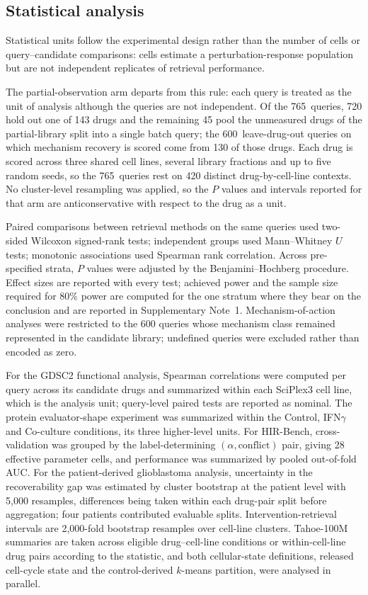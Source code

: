 \documentclass[11pt,letterpaper]{article}
\newcommand{\NALL}{765}                 %
\newcommand{\NMOA}{600}                 %
\begin{document}
\subsection*{Statistical analysis}

Statistical units follow the experimental design rather than the number of cells or
query--candidate comparisons: cells estimate a perturbation-response population but are not
independent replicates of retrieval performance\cite{PseudoRep}.

The partial-observation arm departs from this rule: each query is treated as the unit of analysis although the
queries are not independent. Of the \NALL\ queries, 720 hold out one of 143 drugs and the remaining 45 pool the
unmeasured drugs of the partial-library split into a single batch query; the \NMOA\ leave-drug-out queries on
which mechanism recovery is scored come from 130 of those drugs. Each drug is scored across three shared cell
lines, several library fractions and up to five random seeds, so the \NALL\ queries rest on 420 distinct
drug-by-cell-line contexts. No cluster-level resampling was applied, so the $P$ values and intervals reported for
that arm are anticonservative with respect to the drug as a unit.

Paired comparisons between retrieval methods on the same queries used two-sided Wilcoxon
signed-rank tests; independent groups used Mann--Whitney $U$ tests; monotonic associations used
Spearman rank correlation. Across pre-specified strata, $P$ values were adjusted by the
Benjamini--Hochberg procedure\cite{BenjaminiHochberg}. Effect sizes are reported with every test; achieved power and the sample size required for
80\% power are computed for the one stratum where they bear on the conclusion and are reported in
Supplementary Note~1. Mechanism-of-action analyses were restricted to the 600 queries whose mechanism class
remained represented in the candidate library; undefined queries were excluded rather than encoded
as zero.

For the GDSC2 functional analysis, Spearman correlations were computed per query across its
candidate drugs and summarized within each SciPlex3 cell line, which is the analysis unit;
query-level paired tests are reported as nominal. The protein evaluator-shape experiment was
summarized within the Control, IFN$\gamma$ and Co-culture conditions, its three higher-level units.
For HIR-Bench, cross-validation was grouped by the label-determining
$(\alpha,\mathrm{conflict})$ pair, giving 28 effective parameter cells, and performance was
summarized by pooled out-of-fold AUC. For the patient-derived glioblastoma analysis, uncertainty in
the recoverability gap was estimated by cluster bootstrap at the patient level with 5,000
resamples, differences being taken within each drug-pair split before aggregation; four patients
contributed evaluable splits. Intervention-retrieval intervals are 2,000-fold bootstrap resamples
over cell-line clusters. Tahoe-100M summaries are taken across eligible drug--cell-line conditions
or within-cell-line drug pairs according to the statistic, and both cellular-state definitions,
released cell-cycle state and the control-derived $k$-means partition, were analysed in parallel.
\end{document}
